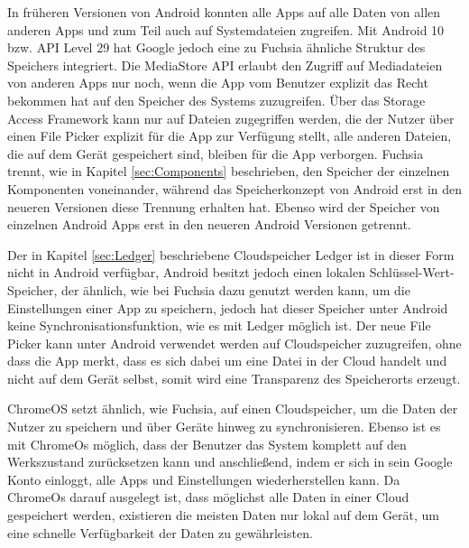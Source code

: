 \documentclass[a4paper]{scrartcl}
\begin{document}
In früheren Versionen von Android konnten alle Apps auf alle Daten von allen anderen Apps und zum Teil auch auf Systemdateien zugreifen. Mit Android 10 bzw. API Level 29 hat Google jedoch eine zu Fuchsia ähnliche Struktur des Speichers integriert. Die MediaStore API erlaubt den Zugriff auf Mediadateien von anderen Apps nur noch, wenn die App vom Benutzer explizit das Recht bekommen hat auf den Speicher des Systems zuzugreifen. Über das Storage Access Framework kann nur auf Dateien zugegriffen werden, die der Nutzer über einen File Picker explizit für die App zur Verfügung stellt, alle anderen Dateien, die auf dem Gerät gespeichert sind, bleiben für die App verborgen. Fuchsia trennt, wie in Kapitel \ref{sec:Components} beschrieben, den Speicher der einzelnen Komponenten voneinander, während das Speicherkonzept von Android erst in den neueren Versionen diese Trennung erhalten hat. Ebenso wird der Speicher von einzelnen Android Apps erst in den neueren Android Versionen getrennt. \cite{Android.Storage.Overview}

Der in Kapitel \ref{sec:Ledger} beschriebene Cloudspeicher Ledger ist in dieser Form nicht in Android verfügbar, Android besitzt jedoch einen lokalen Schlüssel-Wert-Speicher, der ähnlich, wie bei Fuchsia dazu genutzt werden kann, um die Einstellungen einer App zu speichern, jedoch hat dieser Speicher unter Android keine Synchronisationsfunktion, wie es mit Ledger möglich ist. \cite{Android.Storage.Overview} Der neue File Picker kann unter Android verwendet werden auf Cloudspeicher zuzugreifen, ohne dass die App merkt, dass es sich dabei um eine Datei in der Cloud handelt und nicht auf dem Gerät selbst, somit wird eine Transparenz des Speicherorts erzeugt. \cite{Android.Storage.DocumentProvider}

ChromeOS setzt ähnlich, wie Fuchsia, auf einen Cloudspeicher, um die Daten der Nutzer zu speichern und über Geräte hinweg zu synchronisieren. Ebenso ist es mit ChromeOs möglich, dass der Benutzer das System komplett auf den Werkszustand zurücksetzen kann und anschließend, indem er sich in sein Google Konto einloggt, alle Apps und Einstellungen wiederherstellen kann. Da ChromeOs darauf ausgelegt ist, dass möglichst alle Daten in einer Cloud gespeichert werden, existieren die meisten Daten nur lokal auf dem Gerät, um eine schnelle Verfügbarkeit der Daten zu gewährleisten.
\end{document}
